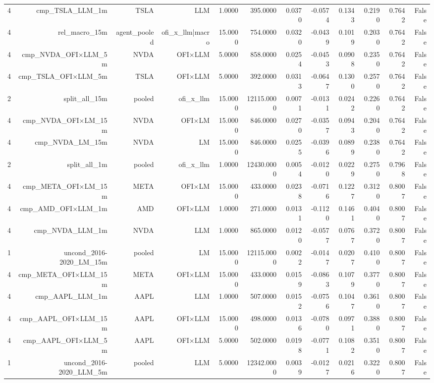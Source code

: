 \begin{table}[htbp]
\begin{tabular}{lrrrrrrrrrrr}
4 & cmp\_TSLA\_LLM\_1m & TSLA & LLM & 1.0000 & 395.0000 & 0.0370 & -0.0574 & 0.1343 & 0.2190 & 0.7642 & False \\
4 & rel\_macro\_15m & agent\_pooled & ofi\_x\_llm|macro & 15.0000 & 754.0000 & 0.0320 & -0.0439 & 0.1019 & 0.2030 & 0.7642 & False \\
4 & cmp\_NVDA\_OFI×LLM\_5m & NVDA & OFI×LLM & 5.0000 & 858.0000 & 0.0254 & -0.0453 & 0.0908 & 0.2350 & 0.7642 & False \\
4 & cmp\_TSLA\_OFI×LLM\_5m & TSLA & OFI×LLM & 5.0000 & 392.0000 & 0.0313 & -0.0647 & 0.1300 & 0.2570 & 0.7642 & False \\
2 & split\_all\_15m & pooled & ofi\_x\_llm & 15.0000 & 12115.0000 & 0.0071 & -0.0131 & 0.0242 & 0.2260 & 0.7642 & False \\
4 & cmp\_NVDA\_OFI×LM\_15m & NVDA & OFI×LM & 15.0000 & 846.0000 & 0.0270 & -0.0357 & 0.0943 & 0.2040 & 0.7642 & False \\
4 & cmp\_NVDA\_LM\_15m & NVDA & LM & 15.0000 & 846.0000 & 0.0255 & -0.0396 & 0.0899 & 0.2380 & 0.7642 & False \\
2 & split\_all\_1m & pooled & ofi\_x\_llm & 1.0000 & 12430.0000 & 0.0054 & -0.0120 & 0.0229 & 0.2750 & 0.7968 & False \\
4 & cmp\_META\_OFI×LM\_15m & META & OFI×LM & 15.0000 & 433.0000 & 0.0238 & -0.0716 & 0.1227 & 0.3120 & 0.8007 & False \\
4 & cmp\_AMD\_OFI×LLM\_1m & AMD & OFI×LLM & 1.0000 & 271.0000 & 0.0131 & -0.1120 & 0.1461 & 0.4040 & 0.8007 & False \\
4 & cmp\_NVDA\_LLM\_1m & NVDA & LLM & 1.0000 & 865.0000 & 0.0120 & -0.0577 & 0.0767 & 0.3720 & 0.8007 & False \\
1 & uncond\_2016-2020\_LM\_15m & pooled & LM & 15.0000 & 12115.0000 & 0.0022 & -0.0147 & 0.0207 & 0.4100 & 0.8007 & False \\
4 & cmp\_META\_OFI×LLM\_15m & META & OFI×LLM & 15.0000 & 433.0000 & 0.0159 & -0.0863 & 0.1079 & 0.3770 & 0.8007 & False \\
4 & cmp\_AAPL\_LLM\_1m & AAPL & LLM & 1.0000 & 507.0000 & 0.0152 & -0.0756 & 0.1047 & 0.3610 & 0.8007 & False \\
4 & cmp\_AAPL\_OFI×LLM\_15m & AAPL & OFI×LLM & 15.0000 & 498.0000 & 0.0136 & -0.0780 & 0.0971 & 0.3880 & 0.8007 & False \\
4 & cmp\_AAPL\_OFI×LLM\_5m & AAPL & OFI×LLM & 5.0000 & 502.0000 & 0.0198 & -0.0771 & 0.1082 & 0.3510 & 0.8007 & False \\
1 & uncond\_2016-2020\_LLM\_5m & pooled & LLM & 5.0000 & 12342.0000 & 0.0039 & -0.0127 & 0.0216 & 0.3220 & 0.8007 & False \\

\end{tabular}
\end{table}
